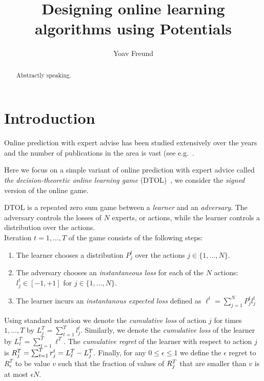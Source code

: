 \documentclass[12pt]{article} %
\title{Designing online learning algorithms using Potentials}
\author{Yoav Freund}
\begin{document}
\maketitle
\begin{abstract}
  Abstractly speaking.
\end{abstract}

\section{Introduction}

Online prediction with expert advise has been studied extensively over
the years and the number of publications in the area is vast (see
e.g.~\cite{vovk1990aggregating, feder1992universal,
  littlestone1994weighted, cesa1997use, cesa2006prediction}.

Here we focus on a simple variant of online prediction with expert
advice called {\em the decision-theoretic online learning game}
(DTOL)~\cite{freund1997decision}, we  consider the {\em
  signed} version of the online game.

DTOL is a repeated zero sum game between a {\em learner} and an {\em
  adversary}. The adversary controls the losses of $N$ experts, or
actions, while the learner controls a distribution over the actions.
~\\
Iteration $t=1,\ldots,T$ of the game consists of the following steps:
\begin{enumerate}
    \item The learner chooses a distribution $P_j^t$ over the
      actions $j \in \{1,\ldots,N\}$. 
    \item The adversary chooses an {\em instantaneous loss} for each
      of the $N$ actions: \\
      $l_j^t \in [-1,+1]$ for $j \in \{1,\ldots,N\}$.
    \item The learner incurs an {\em instantanous expected loss} defined as
      $\ell^t = \sum_{j=1}^N P_j^t l_j^t$
\end{enumerate}

Using standard notation we denote the {\em cumulative loss} of
action $j$ for times $1,\ldots,T$ by $L^T_j = \sum_{t=1}^T l_j^t$.
Similarly, we denote the {\em cumulative loss} of the learner by
$L_\ell^T = \sum_{t=1}^T \ell^T$.
The {\em cumulative regret} of the learner
with respect to action $j$ is $R_j^T = \sum_{t=1}^T r_j^t =
L_\ell^T -L_j^T $. Finally, for any $0\leq \epsilon \leq 1$ we define the $\epsilon$ regret
to $R^T_\epsilon$ to be value $v$ such that the
fraction of values of $R_j^T$ that are smaller than $v$ is at most
$\epsilon N$.
\end{document}

